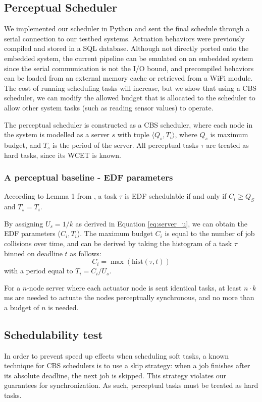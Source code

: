 \documentclass{sigchi}
\begin{document}
  \subsection{Perceptual Scheduler}
  We implemented our scheduler in Python and sent the final schedule through a serial connection to our testbed systems. Actuation behaviors were previously compiled and stored in a SQL database. Although not directly ported onto the embedded system, the current pipeline can be emulated on an embedded system since the serial communication is not the I/O bound, and precompiled behaviors can be loaded from an external memory cache or retrieved from a WiFi module. The cost of running scheduling tasks will increase, but we show that using a CBS scheduler, we can modify the allowed budget that is allocated to the scheduler to allow other system tasks (such as reading sensor values) to operate. 

  The perceptual scheduler is constructed as a CBS scheduler, where each node in the system is modelled as a server $s$ with tuple $\langle Q_s, T_i \rangle$, where $Q_s$ is maximum budget, and $T_s$ is the period of the server. 
  All perceptual tasks $\tau$ are treated as hard tasks, since its WCET is known. 

  \subsubsection{A perceptual baseline - EDF parameters}
  According to Lemma 1 from \cite{abeni_integrating_1998}, a task $\tau$ is EDF schedulable if and only if $C_i \geq Q_S$ and $T_s = T_i$. 

  By assigning $U_s = 1/k$ as derived in Equation \ref{eq:server_u}, we can obtain the EDF parameters ($C_i, T_i$). The maximum budget $C_i$ is equal to the number of job collisions over time, and can be derived by taking the histogram of a task $\tau$ binned on deadline $t$ as follows:
  \begin{equation} 
    C_i = \max(\text{hist}(\tau, t))
    \label{eq:collisions}
  \end{equation}
  with a period equal to $T_i = C_i / U_s$. 

  For a $n$-node server where each actuator node is sent identical tasks, at least $n \cdot k$ ms are needed to actuate the nodes perceptually synchronous, and no more than a budget of $n$ is needed.   

  \subsection{Schedulability test}
  In order to prevent speed up effects when scheduling soft tasks, a known technique for CBS schedulers is to use a skip strategy: when a job finishes after its absolute deadline, the next job is skipped. This strategy violates our guarantees for synchronization. As such, perceptual tasks must be treated as hard tasks. 
\end{document}
